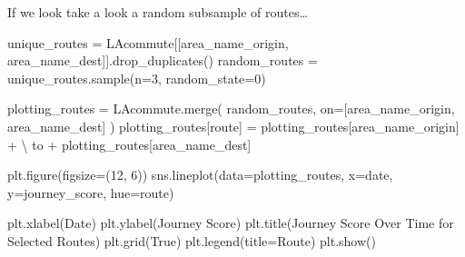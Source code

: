 \documentclass[
  number]{elsarticle}
\newenvironment{Shaded}{\begin{snugshade}}{\end{snugshade}}
\newcommand{\DecValTok}[1]{\textcolor[rgb]{0.68,0.00,0.00}{#1}}
\newcommand{\NormalTok}[1]{\textcolor[rgb]{0.00,0.23,0.31}{#1}}
\newcommand{\OperatorTok}[1]{\textcolor[rgb]{0.37,0.37,0.37}{#1}}
\newcommand{\StringTok}[1]{\textcolor[rgb]{0.13,0.47,0.30}{#1}}
\newcommand{\VariableTok}[1]{\textcolor[rgb]{0.07,0.07,0.07}{#1}}
\begin{document}
If we look take a look a random subsample of routes\ldots{}

\begin{Shaded}
\begin{Highlighting}[]
\NormalTok{unique\_routes }\OperatorTok{=}\NormalTok{ LAcommute[[}\StringTok{\textquotesingle{}area\_name\_origin\textquotesingle{}}\NormalTok{,}
                           \StringTok{\textquotesingle{}area\_name\_dest\textquotesingle{}}\NormalTok{]].drop\_duplicates()}
\NormalTok{random\_routes }\OperatorTok{=}\NormalTok{ unique\_routes.sample(n}\OperatorTok{=}\DecValTok{3}\NormalTok{, random\_state}\OperatorTok{=}\DecValTok{0}\NormalTok{)}

\NormalTok{plotting\_routes }\OperatorTok{=}\NormalTok{ LAcommute.merge(}
\NormalTok{    random\_routes,}
\NormalTok{    on}\OperatorTok{=}\NormalTok{[}\StringTok{\textquotesingle{}area\_name\_origin\textquotesingle{}}\NormalTok{, }\StringTok{\textquotesingle{}area\_name\_dest\textquotesingle{}}\NormalTok{]}
\NormalTok{)}
\NormalTok{plotting\_routes[}\StringTok{\textquotesingle{}route\textquotesingle{}}\NormalTok{] }\OperatorTok{=}\NormalTok{ plotting\_routes[}\StringTok{\textquotesingle{}area\_name\_origin\textquotesingle{}}\NormalTok{] }\OperatorTok{+} \OperatorTok{\textbackslash{}}
    \StringTok{\textquotesingle{} to \textquotesingle{}} \OperatorTok{+}\NormalTok{ plotting\_routes[}\StringTok{\textquotesingle{}area\_name\_dest\textquotesingle{}}\NormalTok{]}

\NormalTok{plt.figure(figsize}\OperatorTok{=}\NormalTok{(}\DecValTok{12}\NormalTok{, }\DecValTok{6}\NormalTok{))}
\NormalTok{sns.lineplot(data}\OperatorTok{=}\NormalTok{plotting\_routes, x}\OperatorTok{=}\StringTok{\textquotesingle{}date\textquotesingle{}}\NormalTok{, y}\OperatorTok{=}\StringTok{\textquotesingle{}journey\_score\textquotesingle{}}\NormalTok{, hue}\OperatorTok{=}\StringTok{\textquotesingle{}route\textquotesingle{}}\NormalTok{)}

\NormalTok{plt.xlabel(}\StringTok{\textquotesingle{}Date\textquotesingle{}}\NormalTok{)}
\NormalTok{plt.ylabel(}\StringTok{\textquotesingle{}Journey Score\textquotesingle{}}\NormalTok{)}
\NormalTok{plt.title(}\StringTok{\textquotesingle{}Journey Score Over Time for Selected Routes\textquotesingle{}}\NormalTok{)}
\NormalTok{plt.grid(}\VariableTok{True}\NormalTok{)}
\NormalTok{plt.legend(title}\OperatorTok{=}\StringTok{\textquotesingle{}Route\textquotesingle{}}\NormalTok{)}
\NormalTok{plt.show()}
\end{Highlighting}
\end{Shaded}
\end{document}
